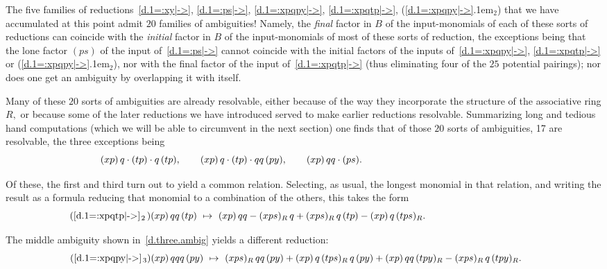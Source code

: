 \documentclass{amsart}
\begin{document}
The five families of reductions~\eqref{d.1=:xy|->}, \eqref{d.1=:ps|->},
\eqref{d.1=:xpqpy|->}, \eqref{d.1=:xpqtp|->},
({{\setlength{\mathsurround}{0em}\ref{d.1=:xpqpy|->}\kern.1em$_{{2}}$}}) that we have accumulated
at this point admit $20$ families of ambiguities!
Namely, the {\em final} factor in $B$ of the
input-monomials of each of these
sorts of reductions can coincide with the {\em initial} factor in $B$
of the input-monomials of most of these sorts of reduction,
the exceptions being that the
lone factor $(ps)$ of the input
of~\eqref{d.1=:ps|->} cannot coincide with the
initial factors of the inputs of~\eqref{d.1=:xpqpy|->},
\eqref{d.1=:xpqtp|->} or ({{\setlength{\mathsurround}{0em}\ref{d.1=:xpqpy|->}\kern.1em$_{{2}}$}}),
nor with the final factor of the input of~\eqref{d.1=:xpqtp|->}
(thus eliminating four of the $25$ potential pairings);
nor does one get an ambiguity by overlapping it with itself.

Many of these $20$ sorts of
ambiguities are already resolvable, either because
of the way they incorporate the structure of the associative ring $R,$
or because some of the later reductions we have introduced served to
make earlier reductions resolvable.
Summarizing long and tedious hand computations (which we will be able
to circumvent in the next section) one finds that
of those $20$ sorts of ambiguities, 17 are
resolvable, the three exceptions being
\begin{equation}\begin{minipage}[c]{35pc}\label{d.three.ambig}
$(xp)\,q\cdot (tp)\cdot q\,(tp),\qquad
(xp)\,q\cdot (tp)\cdot qq\,(py),\qquad
(xp)\,qq\cdot(ps).$
\end{minipage}\end{equation}

Of these, the first and third turn out to yield a common relation.
Selecting, as usual, the longest monomial in that relation,
and writing the result as a formula reducing
that monomial to a combination of the others, this takes the form
\begin{equation}\tag{{{\setlength{\mathsurround}{0em}\ref{d.1=:xpqtp|->}\kern.1em$_{{2\,}}$}}}\begin{minipage}[c]{35pc}
$(xp)\,qq\,(tp)\ \mapsto\ (xp)\,qq - (xps)_R\,q + (xps)_R\,q\,(tp)
- (xp)\,q\,(tps)_R.$
\end{minipage}\end{equation}

The middle ambiguity shown in~\eqref{d.three.ambig}
yields a different reduction:
\begin{equation}\tag{{{\setlength{\mathsurround}{0em}\ref{d.1=:xpqpy|->}\kern.1em$_{{3}}$}}}\begin{minipage}[c]{35pc}
$(xp)\,qqq\,(py)\ \mapsto\ (xps)_R\,qq\,(py) + (xp)\,q\,(tps)_R\,q\,(py)
+ (xp)\,qq\,(tpy)_R - (xps)_R\,q\,(tpy)_R.$
\end{minipage}\end{equation}
\end{document}
